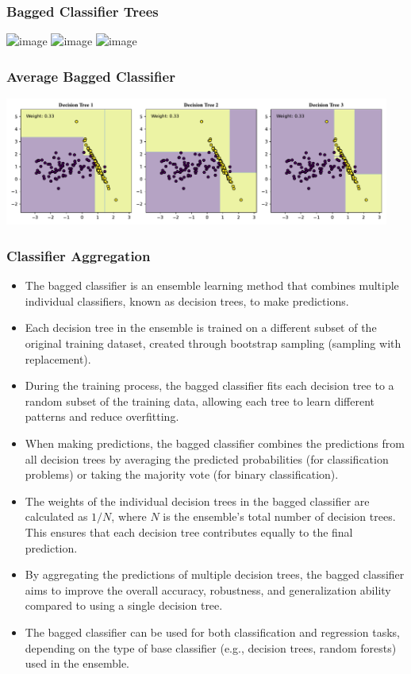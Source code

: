 \documentclass[11pt,aspectratio=1610,usenames,dvipsnames]{beamer} %
\begin{document}
\begin{frame}
	\frametitle{Bagged Classifier Trees}

	\includegraphics<1>[scale=0.70]{./figures/decision_tree_1.svg}
	\includegraphics<2>[scale=0.70]{./figures/decision_tree_2.svg}
	\includegraphics<3>[scale=0.70]{./figures/decision_tree_3.svg}

\end{frame}
\begin{frame}
	\frametitle{Average Bagged Classifier}

	\includegraphics[width=0.95\textwidth]{./figures/bagged_classifier_decision_regions.pdf}
\end{frame}


\begin{frame}
	\frametitle{Classifier Aggregation}

	\begin{itemize}
		\item The bagged classifier is an ensemble learning method that combines multiple individual classifiers, known as decision trees, to make predictions.
		\item Each decision tree in the ensemble is trained on a different subset of the original training dataset, created through bootstrap sampling (sampling with replacement).
		\item During the training process, the bagged classifier fits each decision tree to a random subset of the training data, allowing each tree to learn different patterns and reduce overfitting.
		\item When making predictions, the bagged classifier combines the predictions from all decision trees by averaging the predicted probabilities (for classification problems) or taking the majority vote (for binary classification).
		\item The weights of the individual decision trees in the bagged classifier are calculated as $1/N$, where $N$ is the ensemble's total number of decision trees. This ensures that each decision tree contributes equally to the final prediction.
		\item By aggregating the predictions of multiple decision trees, the bagged classifier aims to improve the overall accuracy, robustness, and generalization ability compared to using a single decision tree.
		\item The bagged classifier can be used for both classification and regression tasks, depending on the type of base classifier (e.g., decision trees, random forests) used in the ensemble.
		\end{itemize}

\end{frame}
\end{document}
